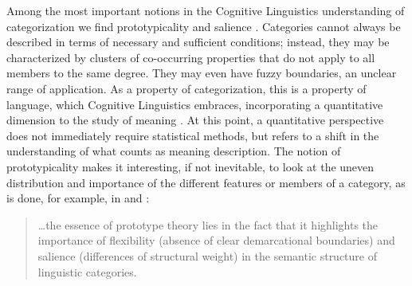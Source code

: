 \documentclass[
]{book}
\begin{document}
Among the most important notions in the Cognitive Linguistics understanding of categorization we find prototypicality and salience \autocite{rosch_1978}. Categories cannot always be described in terms of necessary and sufficient conditions; instead, they may be characterized by clusters of co-occurring properties that do not apply to all members to the same degree. They may even have fuzzy boundaries, an unclear range of application. As a property of categorization, this is a property of language, which Cognitive Linguistics embraces, incorporating a quantitative dimension to the study of meaning \autocite{geeraerts_2010a}. At this point, a quantitative perspective does not immediately require statistical methods, but refers to a shift in the understanding of what counts as meaning description. The notion of prototypicality makes it interesting, if not inevitable, to look at the uneven distribution and importance of the different features or members of a category, as is done, for example, in \textcite{geeraerts.etal_1994} and \textcite{geeraerts_1997}:

\begin{quote}
\ldots the essence of prototype theory lies in the fact that it highlights the importance of flexibility (absence of clear demarcational boundaries) and salience (differences of structural weight) in the semantic structure of linguistic categories. \autocite[74]{geeraerts_2006e}
\end{quote}
\end{document}
